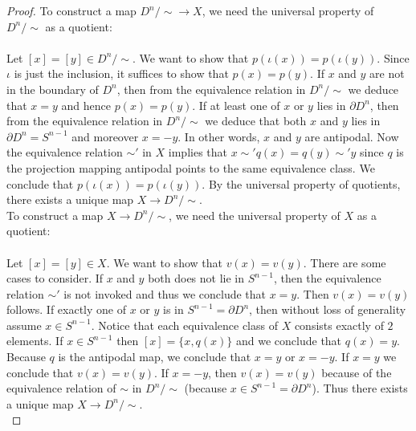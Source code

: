 \documentclass[a4paper]{article}
\begin{document}
\begin{prp}{}{}
\begin{proof}
To construct a map $D^n/\sim\to X$, we need the universal property of $D^n/\sim$ as a quotient: \\
\\
Let $[x]=[y]\in D^n/\sim$. We want to show that $p(\iota(x))=p(\iota(y))$. Since $\iota$ is just the inclusion, it suffices to show that $p(x)=p(y)$. If $x$ and $y$ are not in the boundary of $D^n$, then from the equivalence relation in $D^n/\sim$ we deduce that $x=y$ and hence $p(x)=p(y)$. If at least one of $x$ or $y$ lies in $\partial D^n$, then from the equivalence relation in $D^n/\sim$ we deduce that both $x$ and $y$ lies in $\partial D^n=S^{n-1}$ and moreover $x=-y$. In other words, $x$ and $y$ are antipodal. Now the equivalence relation $\sim'$ in $X$ implies that $x\sim' q(x)=q(y)\sim' y$ since $q$ is the projection mapping antipodal points to the same equivalence class. We conclude that $p(\iota(x))=p(\iota(y))$. By the universal property of quotients, there exists a unique map $X\to D^n/\sim$. \\

To construct a map $X\to D^n/\sim$, we need the universal property of $X$ as a quotient: \\
\\
Let $[x]=[y]\in X$. We want to show that $v(x)=v(y)$. There are some cases to consider. If $x$ and $y$ both does not lie in $S^{n-1}$, then the equivalence relation $\sim'$ is not invoked and thus we conclude that $x=y$. Then $v(x)=v(y)$ follows. If exactly one of $x$ or $y$ is in $S^{n-1}=\partial D^n$, then without loss of generality assume $x\in S^{n-1}$. Notice that each equivalence class of $X$ consists exactly of $2$ elements. If $x\in S^{n-1}$ then $[x]=\{x,q(x)\}$ and we conclude that $q(x)=y$. Because $q$ is the antipodal map, we conclude that $x=y$ or $x=-y$. If $x=y$ we conclude that $v(x)=v(y)$. If $x=-y$, then $v(x)=v(y)$ because of the equivalence relation of $\sim$ in $D^n/\sim$ (because $x\in S^{n-1}=\partial D^n$). Thus there exists a unique map $X\to D^n/\sim$. \\


\end{proof}
\end{prp}
\end{document}
